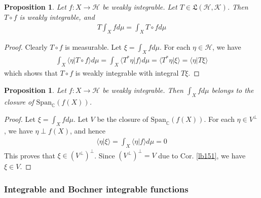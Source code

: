 \documentclass[12pt,b5paper,notitlepage]{article}
\theoremstyle{definition}
\newtheorem{eg}[df]{Example}
\theoremstyle{plain}
\newtheorem{pp}[df]{Proposition}
\newcommand{\fk}{\mathfrak}
\newcommand{\Span}{\mathrm{Span}}
\newcommand{\bk}[1]{\langle {#1}\rangle}
\newcommand{\Cbb}{\mathbb C}
\newcommand{\MH}{\mathcal H}
\newcommand{\MK}{\mathcal K}
\numberwithin{equation}{section}
\begin{document}
\begin{subappendices}
\begin{comment}
\begin{eg}
Let $\xi\in V$. Let $E\in\fk M$ such that $\mu(E)<+\infty$. Then one checks easily that $\chi_E\cdot \xi$ is weakly integrable and
\begin{align*}
\int_X \chi_E\xi\cdot d\mu=\mu(E)\xi
\end{align*}
By linearity, any simple function $f:X\rightarrow V$ vanishing outside a measurable set with finite measure is weakly integrable.
\end{eg}
\end{comment}

\begin{pp}
Let $f:X\rightarrow \MH$ be weakly integrable. Let $T\in\fk L(\MH,\MK)$. Then $T\circ f$ is weakly integrable, and 
\begin{align*}
T\int_X fd\mu=\int_X T\circ fd\mu
\end{align*}
\end{pp}

\begin{proof}
Clearly $T\circ f$ is measurable. Let $\xi=\int_Xfd\mu$. For each $\eta\in \MH$, we have
\begin{align*}
\int_X\bk{\eta|T\circ f}d\mu=\int_X\bk{T^*\eta|f}d\mu=\bk{T^*\eta|\xi}=\bk{\eta|T\xi}
\end{align*} 
which shows that $T\circ f$ is weakly integrable with integral $T\xi$.
\end{proof}


\begin{pp}\label{lb513}
Let $f:X\rightarrow\MH$ be weakly integrable. Then $\int_Xfd\mu$ belongs to the closure of $\Span_\Cbb(f(X))$.
\end{pp}

\begin{proof}
Let $\xi=\int_Xfd\mu$. Let $V$ be the closure of $\Span_\Cbb(f(X))$. For each $\eta\in V^\perp$, we have $\eta\perp f(X)$, and hence
\begin{align*}
\bk{\eta|\xi}=\int_X\bk{\eta|f}d\mu=0
\end{align*}
This proves that $\xi\in (V^\perp)^\perp$. Since $(V^\perp)^\perp=V$ due to Cor. \ref{lb151}, we have $\xi\in V$.
\end{proof}








\subsubsection{Integrable and Bochner integrable functions}


\end{subappendices}
\end{document}
